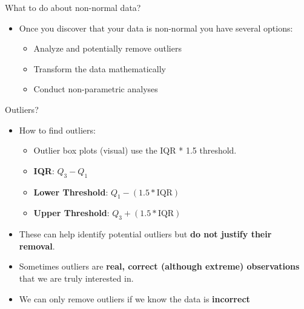 \documentclass[
  ignorenonframetext,
]{beamer}
\providecommand{\tightlist}{%
  \setlength{\itemsep}{0pt}\setlength{\parskip}{0pt}}
\begin{document}
\begin{frame}{What to do about non-normal data?}
\label{what-to-do-about-non-normal-data}
\begin{itemize}
\item
  Once you discover that your data is non-normal you have several
  options:

  \begin{itemize}
  \tightlist
  \item
    Analyze and potentially remove outliers
  \item
    Transform the data mathematically
  \item
    Conduct non-parametric analyses
  \end{itemize}
\end{itemize}
\end{frame}

\begin{frame}{Outliers?}
\label{outliers}
\begin{itemize}
\tightlist
\item
  How to find outliers:

  \begin{itemize}
  \tightlist
  \item
    Outlier box plots (visual) use the IQR * 1.5 threshold.
  \item
    \textbf{IQR}: \(Q_3 - Q_1\)
  \item
    \textbf{Lower Threshold}: \(Q_1 - (1.5 * \text{IQR})\)
  \item
    \textbf{Upper Threshold}: \(Q_3 + (1.5 * \text{IQR})\)
  \end{itemize}
\end{itemize}

\begin{itemize}
\tightlist
\item
  These can help identify potential outliers but \textbf{do not justify
  their removal}.
\end{itemize}

\begin{itemize}
\tightlist
\item
  Sometimes outliers are \textbf{real, correct (although extreme)
  observations} that we are truly interested in.
\end{itemize}

\begin{itemize}
\tightlist
\item
  We can only remove outliers if we know the data is \textbf{incorrect}
\end{itemize}
\end{frame}
\end{document}
